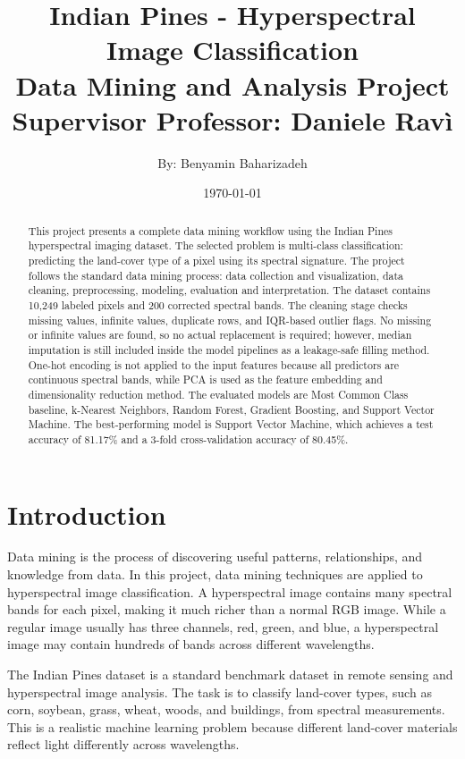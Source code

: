 \documentclass[12pt,a4paper]{article}
\title{\textbf{Indian Pines - Hyperspectral Image Classification}\\
\large Data Mining and Analysis Project\\
\large Supervisor Professor: Daniele Ravì}
\author{By: Benyamin Baharizadeh}
\date{\today}
\begin{document}
\maketitle

\begin{abstract}
This project presents a complete data mining workflow using the Indian Pines hyperspectral imaging dataset. The selected problem is multi-class classification: predicting the land-cover type of a pixel using its spectral signature. The project follows the standard data mining process: data collection and visualization, data cleaning, preprocessing, modeling, evaluation and interpretation. The dataset contains 10,249 labeled pixels and 200 corrected spectral bands. The cleaning stage checks missing values, infinite values, duplicate rows, and IQR-based outlier flags. No missing or infinite values are found, so no actual replacement is required; however, median imputation is still included inside the model pipelines as a leakage-safe filling method. One-hot encoding is not applied to the input features because all predictors are continuous spectral bands, while PCA is used as the feature embedding and dimensionality reduction method. The evaluated models are Most Common Class baseline, k-Nearest Neighbors, Random Forest, Gradient Boosting, and Support Vector Machine. The best-performing model is Support Vector Machine, which achieves a test accuracy of 81.17\% and a 3-fold cross-validation accuracy of 80.45\%.
\end{abstract}

\tableofcontents
\newpage

\section{Introduction}

Data mining is the process of discovering useful patterns, relationships, and knowledge from data. In this project, data mining techniques are applied to hyperspectral image classification. A hyperspectral image contains many spectral bands for each pixel, making it much richer than a normal RGB image. While a regular image usually has three channels, red, green, and blue, a hyperspectral image may contain hundreds of bands across different wavelengths.

The Indian Pines dataset is a standard benchmark dataset in remote sensing and hyperspectral image analysis. The task is to classify land-cover types, such as corn, soybean, grass, wheat, woods, and buildings, from spectral measurements. This is a realistic machine learning problem because different land-cover materials reflect light differently across wavelengths.
\end{document}
